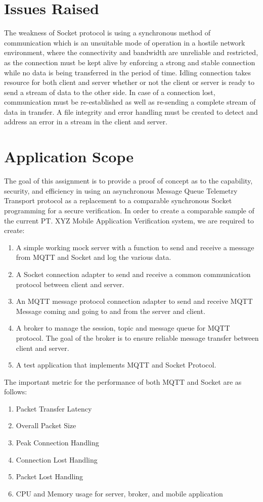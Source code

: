 \section{Issues Raised}
The weakness of Socket protocol is using a synchronous method of communication which is an unsuitable mode of operation in a hostile network environment, where the connectivity and bandwidth are unreliable and restricted, as the connection must be kept alive by enforcing a strong and stable connection while no data is being transferred in the period of time. Idling connection takes resource for both client and server whether or not the client or server is ready to send a stream of data to the other side. In case of a connection lost, communication must be re-established as well as re-sending a complete stream of data in transfer. A file integrity and error handling must be created to detect and address an error in a stream in the client and server.

\section{Application Scope}
The goal of this assignment is to provide a proof of concept as to the capability, security, and efficiency in using an asynchronous  Message Queue Telemetry Transport protocol as a replacement to a comparable synchronous Socket programming for a secure verification.
In order to create a comparable sample of the current PT. XYZ Mobile Application Verification system, we are required to create:
\begin{enumerate}
    \itemsep0em
    \item A simple working mock server with a function to send and receive a message from  MQTT and Socket and log the various data. 
	\item A Socket connection adapter to send and receive a common communication protocol between client and server.
    \item An MQTT message protocol connection adapter to send and receive MQTT Message coming and going to and from the server and client. 
	\item A broker to manage the session, topic and message queue for MQTT protocol. The goal of the broker is to ensure reliable message transfer between client and server.
    \item A test application that implements MQTT and Socket Protocol. 
\end{enumerate}
The important metric for the performance of both MQTT and Socket are as follows:
\begin{enumerate}
	\itemsep0em
    \item Packet Transfer Latency
    \item Overall Packet Size
    \item Peak Connection Handling
    \item Connection Lost Handling
    \item Packet Lost Handling
    \item CPU and Memory usage for server, broker, and mobile application
\end{enumerate}


